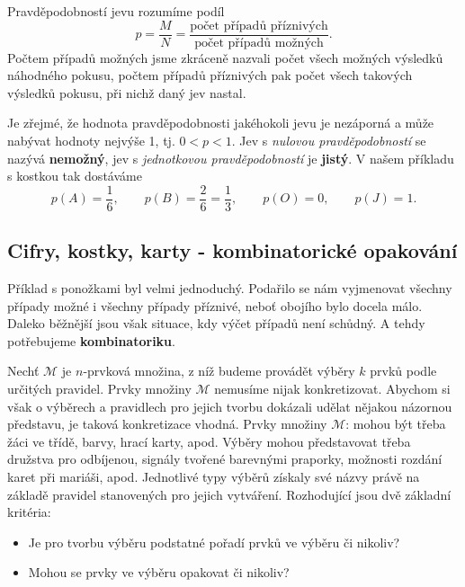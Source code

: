       \begin{definition}
        Pravděpodobností jevu rozumíme podíl
        \begin{equation}\label{mai:eq011}
          p = \frac{M}{N} = \frac{\text{počet případů příznivých}}{\text{počet případů možných}}.
        \end{equation}  
        Počtem případů možných jsme zkráceně nazvali počet všech možných výsledků náhodného 
        pokusu, počtem případů příznivých pak počet všech takových výsledků pokusu, při nichž daný 
        jev nastal.
      \end{definition}
      Je zřejmé, že hodnota pravděpodobnosti jakéhokoli jevu je nezáporná a může nabývat hodnoty 
      nejvýše \num{1}, tj. \(0 <p< 1\). Jev s \emph{nulovou pravděpodobností} se nazývá 
      \textbf{nemožný}, jev s \emph{jednotkovou pravděpodobností} je \textbf{jistý}. V našem 
      příkladu s kostkou tak dostáváme
      \begin{equation*}
        p(A) = \frac{1}{6}, \qquad p(B) = \frac{2}{6} = \frac{1}{3}, \qquad
        p(O) = 0, \qquad p(J) = 1.
      \end{equation*}  

      
    \subsection{Cifry, kostky, karty - kombinatorické opakování}
      Příklad s ponožkami byl velmi jednoduchý. Podařilo se nám vyjmenovat všechny případy možné i 
      všechny případy příznivé, neboť obojího bylo docela málo. Daleko běžnější jsou však situace, 
      kdy výčet případů není schůdný. A tehdy potřebujeme \textbf{kombinatoriku}.
      
      Nechť \(\mathcal{M}\) je \(n\)-prvková množina, z níž budeme provádět výběry \(k\) prvků 
      podle určitých pravidel. Prvky množiny \(\mathcal{M}\) nemusíme nijak konkretizovat. Abychom 
      si však o výběrech a pravidlech pro jejich tvorbu dokázali udělat nějakou názornou představu, 
      je taková konkretizace vhodná. Prvky množiny \(\mathcal{M}\): mohou být třeba žáci ve třídě, 
      barvy, hrací karty, apod. Výběry mohou představovat třeba družstva pro odbíjenou, signály 
      tvořené barevnými praporky, možnosti rozdání karet při mariáši, apod. Jednotlivé typy výběrů 
      získaly své názvy právě na základě pravidel stanovených pro jejich vytváření. Rozhodující 
      jsou dvě základní kritéria:
      \begin{itemize}\addtolength{\itemsep}{-0.5\baselineskip}
        \item Je pro tvorbu výběru podstatné pořadí prvků ve výběru či nikoliv?
        \item Mohou se prvky ve výběru opakovat či nikoliv?
      \end{itemize}
      
